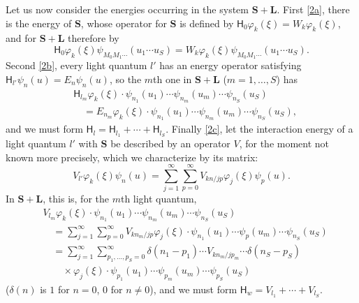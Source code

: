 \documentclass[fontsize=13pt,twoside,openany,headings=normal,parskip=false,bookmarkpackage=false,DIV=calc]{scrbook}
\begin{document}
Let us now consider the energies occurring in the system $\boldsymbol{S}+\boldsymbol{L}$. First \hyperref[problem:III.6.2alpha]{[2a]}, there is the energy of $\boldsymbol{S}$, whose operator for $\boldsymbol{S}$ is defined by $\mathsf{H}_0\varphi_k(\xi)=W_k\varphi_k(\xi)$, and for $\boldsymbol{S}+\boldsymbol{L}$ therefore by
\[
 \mathsf{H}_0\varphi_k(\xi)\psi_{M_0M_1\cdots}(u_1\cdots u_S)
 =W_k\varphi_k(\xi)\psi_{M_0M_1\cdots}(u_1\cdots u_S).
\]
Second \hyperref[problem:III.6.2beta]{[2b]}, every light quantum $l'$ has an energy operator satisfying $\mathsf{H}_{l'}\psi_n(u)=E_n\psi_n(u)$,
\hypertarget{origpage-148}{}so the $m$th one in $\boldsymbol{S}+\boldsymbol{L}$ ($m=1,\ldots,S$) has
\begin{align*}
 &\mathsf{H}_{l_m}\varphi_k(\xi)\cdot\psi_{n_1}(u_1)\cdots\psi_{n_m}(u_m)\cdots\psi_{n_S}(u_S)\\
 &\quad=E_{n_m}\varphi_k(\xi)\cdot\psi_{n_1}(u_1)\cdots\psi_{n_m}(u_m)\cdots\psi_{n_S}(u_S),
\end{align*}
and we must form $\mathsf{H}_l=\mathsf{H}_{l_1}+\cdots+\mathsf{H}_{l_S}$. Finally \hyperref[problem:III.6.2gamma]{[2c]}, let the interaction energy of a light quantum $l'$ with $\boldsymbol{S}$ be described by an operator $V$, for the moment not known more precisely, which we characterize by its matrix:
\[
 V_{l'}\varphi_k(\xi)\psi_n(u)=\sum_{j=1}^{\infty}\sum_{p=0}^{\infty}V_{kn/jp}\varphi_j(\xi)\psi_p(u).
\]
In $\boldsymbol{S}+\boldsymbol{L}$, this is, for the $m$th light quantum,
\begin{align*}
 &V_{l_m}\varphi_k(\xi)\cdot\psi_{n_1}(u_1)\cdots\psi_{n_m}(u_m)\cdots\psi_{n_S}(u_S)\\
 &\quad=\sum_{j=1}^{\infty}\sum_{p=0}^{\infty}V_{kn_m/jp}\varphi_j(\xi)\cdot
 \psi_{n_1}(u_1)\cdots\psi_p(u_m)\cdots\psi_{n_S}(u_S)\\
 &\quad=\sum_{j=1}^{\infty}\sum_{p_1,\ldots,p_S=0}^{\infty}
 \delta(n_1-p_1)\cdots V_{kn_m/jp_m}\cdots\delta(n_S-p_S)\\
 &\qquad{}\times\varphi_j(\xi)\cdot\psi_{p_1}(u_1)\cdots\psi_{p_m}(u_m)\cdots\psi_{p_S}(u_S)
\end{align*}
($\delta(n)$ is $1$ for $n=0$, $0$ for $n\ne0$), and we must form $\mathsf{H}_w=V_{l_1}+\cdots+V_{l_S}$.
\end{document}
